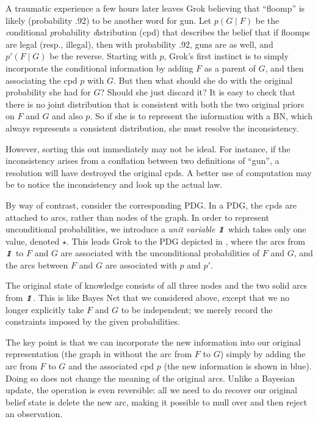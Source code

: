 \begin{example}
A traumatic experience a few hours later leaves Grok believing that
``floomp'' is likely (probability .92) to be another word for gun.
Let $p(G \mid F)$ be the \emph conditional \emph probability \emph
distribution (cpd) that describes 
the belief that if floomps are legal (resp., illegal),
then with probability .92, guns are as well, and $p'(F \mid G)$ be
the reverse. 
Starting with $p$, Grok's first instinct is to
simply incorporate the conditional information by adding $F$ as a parent of
$G$, and then associating
the cpd
$p$ with $G$. But then what should she do
with the original probability she had for $G$?  Should she just discard it?
It is easy to check that there is no 
joint distribution
that is consistent with
both
the two original priors on $F$ and $G$ and also 
$p$.  So if she
is to represent the information with a BN, which always represents a consistent
distribution, she must resolve the inconsistency. 





However,
sorting this out immediately may not be ideal.
For instance, if the inconsistency arises from a conflation between
two definitions 
of ``gun'', a resolution will have destroyed the original cpds. A
better use of computation may be to notice the inconsistency and look
up the actual law. 

By way of contrast, consider the corresponding PDG. In a PDG, the cpds are
attached to arcs, rather than nodes of the graph.
In order to represent unconditional probabilities, we introduce
a \emph{unit variable} $\pdgunit$ which 
takes only one value, denoted
$\star$. 
This leads Grok to 
the PDG depicted in ,
where the arcs from $\pdgunit$ to $F$ and $G$ are associated with the
unconditional probabilities of $F$ and $G$, and the 
arcs between $F$ and $G$ are associated with $p$ and $p'$.



The original state of knowledge consists of all three nodes and the two
solid
arcs from $\pdgunit$. This is like Bayes Net that we considered above,
except that we 
no longer
explicitly
take  $F$ and $G$ to be independent; we merely record the constraints
imposed by the given probabilities.  
	
The key point is that we can incorporate the new information into our original
representation (the graph in  without the arc from
$F$ to $G$) simply  by adding the arc from $F$ to $G$ and the associated cpd
$p$ (the new information is shown in blue).
Doing so does not change the meaning of the original arcs.   
Unlike a Bayesian update, the operation is even reversible: all we need
to do recover our original belief state is delete the new arc, 
making it possible to mull over and then reject an observation.
\end{example}


